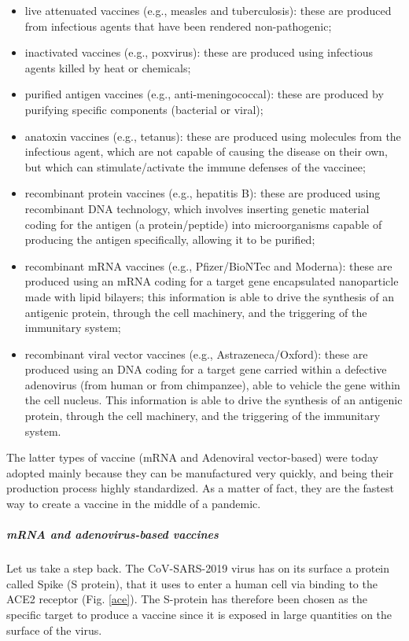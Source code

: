 \documentclass[graybox]{svmult}
\begin{document}
\begin{itemize}
\item live attenuated vaccines (e.g., measles and tuberculosis): these are produced from infectious agents that have been rendered non-pathogenic;
\item inactivated vaccines (e.g., poxvirus): these are produced using infectious agents killed by heat or chemicals;
\item purified antigen vaccines (e.g., anti-meningococcal): these are produced by purifying specific components (bacterial or viral);
\item anatoxin vaccines (e.g., tetanus): these are produced using molecules from the infectious agent, which are not capable of causing the disease on their own, but which can stimulate/activate the immune defenses of the vaccinee;
\item recombinant protein vaccines (e.g., hepatitis B): these are produced using recombinant DNA technology, which involves inserting genetic material coding for the antigen (a protein/peptide) into microorganisms capable of producing the antigen specifically, allowing it to be purified;
\item recombinant mRNA vaccines (e.g., Pfizer/BioNTec and Moderna): these are produced using an mRNA coding for a target gene encapsulated nanoparticle made with lipid bilayers; this information is able to drive the synthesis of an antigenic protein, through the cell machinery, and the triggering of the immunitary system;
\item recombinant viral vector vaccines (e.g., Astrazeneca/Oxford): these are produced using an DNA coding for a target gene carried within a defective adenovirus (from human or from chimpanzee), able to vehicle the gene within the cell nucleus. This information is able to drive the synthesis of an antigenic protein, through the cell machinery, and the triggering of the immunitary system. 
\end{itemize}

The latter types of vaccine (mRNA and Adenoviral vector-based) were today adopted mainly because they can be manufactured very quickly, and being their production process highly standardized. As a matter of fact, they are the fastest way to create a vaccine in the middle of a pandemic.

\subparagraph{mRNA and adenovirus-based vaccines}
\label{based} 

Let us take a step back. The CoV-SARS-2019 virus has on its surface a protein called Spike (S protein), that it uses to enter a human cell via binding to the ACE2 receptor (Fig. \ref{ace}). The S-protein has therefore been chosen as the specific target to produce a vaccine since it is exposed in large quantities on the surface of the virus.
\end{document}
